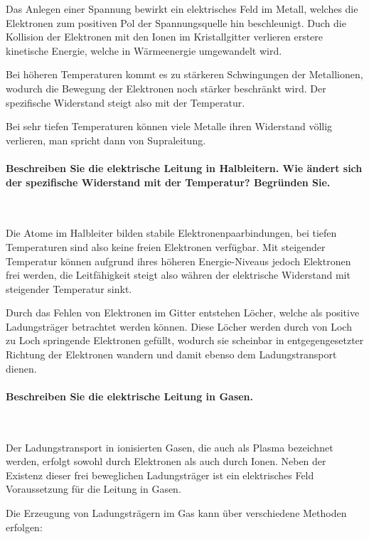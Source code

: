 \documentclass[a4paper, 11pt, parskip=half]{scrartcl}
\begin{document}
Das Anlegen einer Spannung bewirkt ein elektrisches Feld im Metall, welches die Elektronen zum
positiven Pol der Spannungsquelle hin beschleunigt. Duch die Kollision der Elektronen mit den Ionen
im Kristallgitter verlieren erstere kinetische Energie, welche in Wärmeenergie umgewandelt wird.

Bei höheren Temperaturen kommt es zu stärkeren Schwingungen der Metallionen, wodurch die Bewegung
der Elektronen noch stärker beschränkt wird. Der spezifische Widerstand steigt also mit der
Temperatur.

Bei sehr tiefen Temperaturen können viele Metalle ihren Widerstand völlig verlieren, man spricht
dann von Supraleitung.

\paragraph{Beschreiben Sie die elektrische Leitung in Halbleitern. Wie ändert sich der spezifische
Widerstand mit der Temperatur? Begründen Sie.} ~

Die Atome im Halbleiter bilden stabile Elektronenpaarbindungen, bei tiefen Temperaturen sind also
keine freien Elektronen verfügbar. Mit steigender Temperatur können aufgrund ihres höheren
Energie-Niveaus jedoch Elektronen frei werden, die Leitfähigkeit steigt also währen der elektrische
Widerstand mit steigender Temperatur sinkt.

Durch das Fehlen von Elektronen im Gitter entstehen Löcher, welche als positive Ladungsträger
betrachtet werden können. Diese Löcher werden durch von Loch zu Loch springende Elektronen gefüllt,
wodurch sie scheinbar in entgegengesetzter Richtung der Elektronen wandern und damit ebenso dem
Ladungstransport dienen.

\paragraph{Beschreiben Sie die elektrische Leitung in Gasen.} ~

Der Ladungstransport in ionisierten Gasen, die auch als Plasma bezeichnet werden, erfolgt sowohl
durch Elektronen als auch durch Ionen. Neben der Existenz dieser frei beweglichen Ladungsträger ist
ein elektrisches Feld Voraussetzung für die Leitung in Gasen.

Die Erzeugung von Ladungsträgern im Gas kann über verschiedene Methoden erfolgen:
\end{document}
